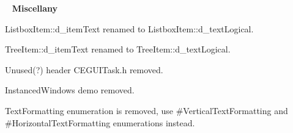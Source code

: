 ~\newline
 {\bfseries{Miscellany}}
\begin{DoxyItemize}
\item {\ttfamily Listbox\+Item\+::d\+\_\+item\+Text} renamed to Listbox\+Item\+::d\+\_\+text\+Logical.
\item {\ttfamily Tree\+Item\+::d\+\_\+item\+Text} renamed to Tree\+Item\+::d\+\_\+text\+Logical.
\item Unused(?) header C\+E\+G\+U\+I\+Task.\+h removed.
\item Instanced\+Windows demo removed.
\item {\ttfamily Text\+Formatting} enumeration is removed, use \#\+Vertical\+Text\+Formatting and \#\+Horizontal\+Text\+Formatting enumerations instead. 
\end{DoxyItemize}